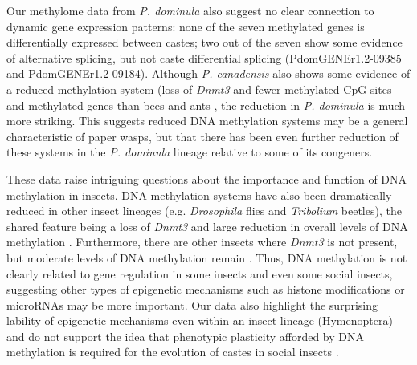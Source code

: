 Our methylome data from \textit{P. dominula} also suggest no clear
connection to dynamic gene expression patterns: none of the seven
methylated genes is differentially expressed between castes; two out of
the seven show some evidence of alternative splicing, but not caste
differential splicing (PdomGENEr1.2-09385 and PdomGENEr1.2-09184).
Although \textit{P. canadensis} also shows some evidence of a reduced
methylation system (loss of \textit{Dnmt3} and fewer methylated CpG sites
and methylated genes than bees and ants \cite{PcanGenome}, the
reduction in \textit{P. dominula} is much more striking. This suggests
reduced DNA methylation systems may be a general characteristic of paper
wasps, but that there has been even further reduction of these systems
in the \textit{P. dominula} lineage relative to some of its congeners.

These data raise intriguing questions about the importance and function
of DNA methylation in insects. DNA methylation systems have also been
dramatically reduced in other insect lineages (e.g. \textit{Drosophila}
flies and \textit{Tribolium} beetles), the shared feature being a loss of
\textit{Dnmt3} and large reduction in overall levels of DNA methylation
\cite{Glastad2011}.
Furthermore, there are other insects where \textit{Dnmt3} is not present,
but moderate levels of DNA methylation remain \cite{Mita2004,PcanGenome}.
Thus, DNA methylation is not clearly related to gene
regulation in some insects \cite{Glastad2014} and even some social insects, suggesting other
types of epigenetic mechanisms such as histone modifications \cite{SimolaEpi} or
microRNAs may be more important. Our data also highlight the surprising
lability of epigenetic mechanisms even within an insect lineage
(Hymenoptera) and do not support the idea that phenotypic plasticity
afforded by DNA methylation is required for the evolution of castes in
social insects \cite{Weiner2012}.


